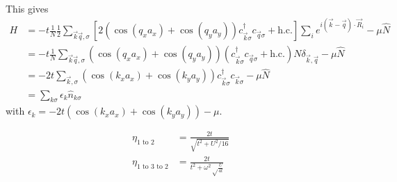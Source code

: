 \documentclass[12pt]{article}
\numberwithin{equation}{section}
\begin{document}
This gives
\begin{equation}\begin{aligned}
	H &= -t \frac{1}{N} \frac{1}{2}\sum_{\vec k \vec q, \sigma}\left[2\left(\cos(q_x a_x) + \cos(q_y a_y)\right)c^\dagger_{\vec k \sigma}c_{ \vec q\sigma} + \text{h.c.}\right]\sum_{i} e^{i \left( \vec k - \vec q \right)\cdot \vec R_i} - \mu \hat N\\
	  &= -t \frac{1}{N} \sum_{\vec k \vec q, \sigma} \left(\cos(q_x a_x) + \cos(q_y a_y)\right)\left(c^\dagger_{\vec k \sigma}c_{\vec q\sigma} + \text{h.c.}\right)N\delta_{\vec k, \vec q} - \mu \hat N\\
	  &= -2t\sum_{\vec k, \sigma}\left(\cos(k_x a_x) + \cos(k_y a_y)\right)c^\dagger_{\vec k\sigma}c_{\vec k\sigma} - \mu \hat N\\
	  &= \sum_{k\sigma}\epsilon_k \hat n_{k\sigma}
\end{aligned}\end{equation}
with $\epsilon_k = -2t\left(\cos(k_x a_x) + \cos(k_y a_y)\right) - \mu$.

\newpage
\begin{equation*}\begin{aligned}
	\eta_\text{1 to 2} &= \frac{2t}{\sqrt{t^2 + U^2/16}}\\
	\eta_\text{1 to 3 to 2} &= \frac{2t}{t^2 + \omega^2 \sqrt\frac{U}{4t}}\\
\end{aligned}\end{equation*}












\maketitle


\end{document}
